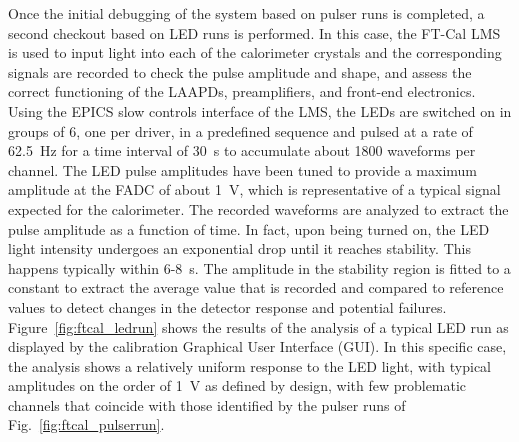 Once the initial debugging of the system based on pulser runs is completed, a second checkout based
on LED runs is performed. In this case, the FT-Cal LMS is used to input light into each of the calorimeter crystals and the
corresponding signals are recorded to check the pulse amplitude and shape, and assess the correct functioning of
the LAAPDs, preamplifiers, and front-end electronics. Using the EPICS slow controls interface of the LMS, the LEDs
are switched on in groups of 6, one per driver, in a predefined sequence and pulsed at a rate of 62.5~Hz for a time
interval of 30~s to accumulate about 1800 waveforms per channel. The LED pulse amplitudes have been tuned to
provide a maximum amplitude at the FADC of about 1~V, which is representative of a typical signal expected for the
calorimeter. The recorded waveforms are analyzed to extract the pulse amplitude as a function of time. In fact, upon
being turned on, the LED light intensity undergoes an exponential drop until it reaches stability. This happens typically
within 6-8~s. The amplitude in the stability region is fitted to a constant to extract the average value that is recorded
and compared to reference values to detect changes in the detector response and potential failures.
Figure~\ref{fig:ftcal_ledrun} shows the results of the analysis of a typical LED run as displayed by the calibration
Graphical User Interface (GUI). In this specific case, the analysis shows a relatively uniform response to the LED light,
with typical amplitudes on the order of 1~V as defined by design, with few problematic channels that coincide with those
identified by the pulser runs of Fig.~\ref{fig:ftcal_pulserrun}. 

